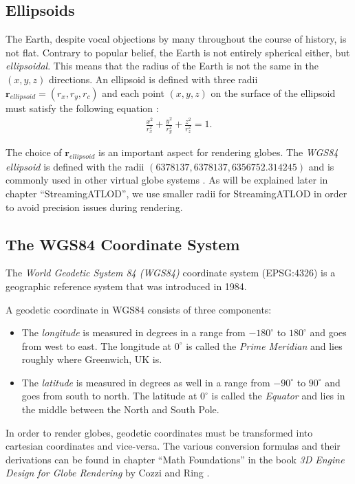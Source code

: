 \subsection{Ellipsoids}
The Earth, despite vocal objections by many throughout the course of history, is not flat.
Contrary to popular belief, the Earth is not entirely spherical either,
but \textit{ellipsoidal}. This means that the 
radius of the Earth is not the same in the $(x,y,z)$ directions. 
An ellipsoid is defined with three radii $\mathbf{r}_{ellipsoid} = (r_x,r_y,r_c)$ 
and each point $(x,y,z)$ on the surface of the ellipsoid must satisfy the following equation \cite[p.~17]{3denginedesignforvirtualglobes}:
\begin{align*}
\frac{x^2}{r_x^2} + \frac{y^2}{r_y^2} + \frac{z^2}{r_z^2} = 1.  
\end{align*}

The choice of $\mathbf{r}_{ellipsoid}$ is an important aspect for rendering globes.
The \textit{WGS84 ellipsoid} is defined with the radii $(6378137, 6378137, 6356752.314245)$ and 
is commonly used in other virtual globe systems \cite[p.~19]{3denginedesignforvirtualglobes}.
As will be explained later in chapter ``StreamingATLOD'', we use smaller radii for StreamingATLOD in order to avoid 
precision issues during rendering.

\subsection{The WGS84 Coordinate System}
The \textit{World Geodetic System 84 (WGS84)} coordinate system
(EPSG:4326) is a geographic reference system that
was introduced in 1984. 

A geodetic coordinate in WGS84 consists of three components:
\begin{itemize}
  \item The \textit{longitude} is measured in degrees
  in a range from $-180^\circ$ to $180^\circ$ and goes from west to east.
  The longitude at $0^\circ$ is called the \textit{Prime Meridian}
  and lies roughly where Greenwich, UK is.
  \item The \textit{latitude} is measured in degrees as well 
  in a range from $-90^\circ$ to $90^\circ$ and goes from south to north.
  The latitude at $0^\circ$ is called the \textit{Equator} 
  and lies in the middle between the North and South Pole.
\end{itemize}

In order to render globes, geodetic coordinates must be transformed into 
cartesian coordinates and vice-versa.
The various conversion formulas and their derivations can be found in 
chapter ``Math Foundations''
in the book \textit{3D Engine Design for Globe Rendering} 
by Cozzi and Ring \cite[p.~13]{3denginedesignforvirtualglobes}.

